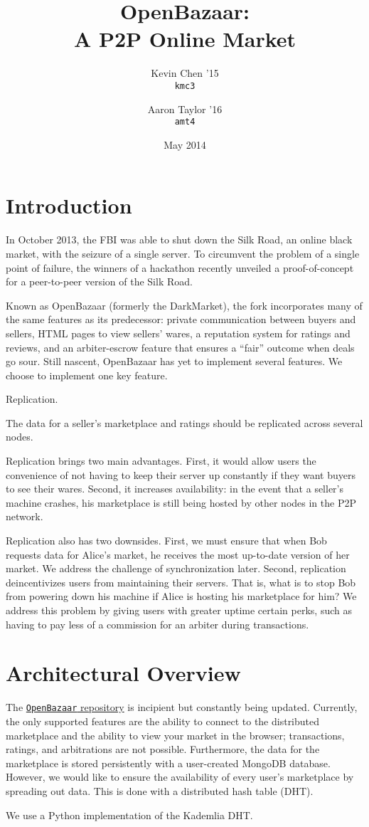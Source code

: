 \documentclass[12pt,twocolumn]{article}
\title{\bf \sc OpenBazaar: \\ A P2P Online Market}
\author{
    {\rm Kevin Chen '15} \\
    {\tt kmc3}
    \and 
    {\rm Aaron Taylor '16} \\
    {\tt amt4}
}
\date{May 2014}
\begin{document}
\maketitle

\doublespacing

\section{Introduction}
In October 2013, the FBI was able to shut down the Silk Road, an online black market, with the seizure of a single server. To circumvent the problem of a single point of failure, the winners of a hackathon recently unveiled a proof-of-concept for a peer-to-peer version of the Silk Road.

Known as OpenBazaar (formerly the DarkMarket), the fork incorporates many of the same features as its predecessor: private communication between buyers and sellers, HTML pages to view sellers' wares, a reputation system for ratings and reviews, and an arbiter-escrow feature that ensures a ``fair'' outcome when deals go sour. Still nascent, OpenBazaar has yet to implement several features.
We choose to implement one key feature.

Replication.

The data for a seller's marketplace and ratings should be replicated across several nodes.

Replication brings two main advantages.
First, it would allow users the convenience of not having to keep their server up constantly if they want buyers to see their wares.
Second, it increases availability: in the event that a seller's machine crashes, his marketplace is still being hosted by other nodes in the P2P network.

Replication also has two downsides. First, we must ensure that when Bob requests data for Alice's market, he receives the most up-to-date version of her market. We address the challenge of synchronization later.
Second, replication deincentivizes users from maintaining their servers. That is, what is to stop Bob from powering down his machine if Alice is hosting his marketplace for him? We address this problem by giving users with greater uptime certain perks, such as having to pay less of a commission for an arbiter during transactions.

\section{Architectural Overview}
The \href{https://github.com/OpenBazaar/OpenBazaar}{{\tt OpenBazaar} repository} is incipient but constantly being updated. Currently, the only supported features are the ability to connect to the distributed marketplace and the ability to view your market in the browser; transactions, ratings, and arbitrations are not possible. Furthermore, the data for the marketplace is stored persistently with a user-created MongoDB database. However, we would like to ensure the availability of every user's marketplace by spreading out data. This is done with a distributed hash table (DHT).

We use a Python implementation of the Kademlia DHT.
\end{document}
